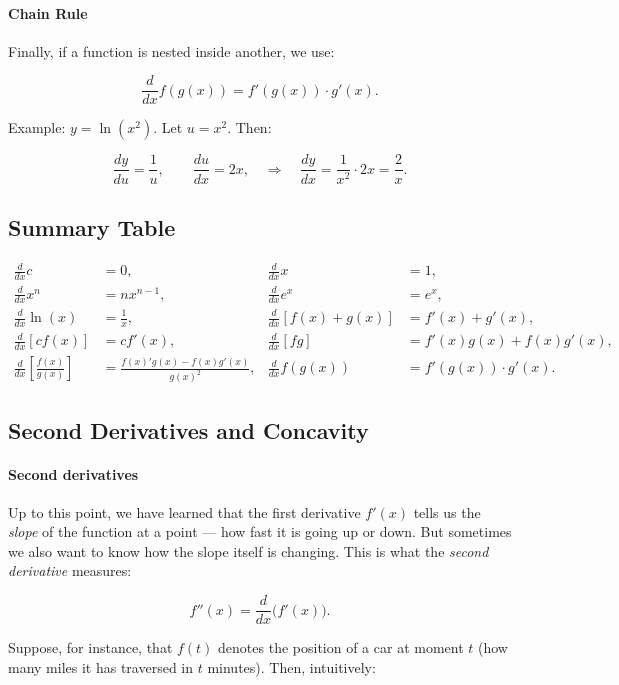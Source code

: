 \documentclass[11pt,letterpaper]{article}
\begin{document}
\paragraph{Chain Rule} 
Finally, if a function is nested inside another, we use:

\[
\frac{d}{dx} f(g(x)) = f'(g(x)) \cdot g'(x).
\]

\noindent Example: $y = \ln(x^2)$. Let $u=x^2$. Then:

\[
\frac{dy}{du} = \frac{1}{u}, \qquad \frac{du}{dx} = 2x, \quad \Rightarrow \quad \frac{dy}{dx} = \frac{1}{x^2}\cdot 2x = \frac{2}{x}.
\]

\subsection*{Summary Table}

\begin{align*}
\frac{d}{dx} c &= 0, & \frac{d}{dx} x &= 1, \\
\frac{d}{dx} x^n &= n x^{n-1}, & \frac{d}{dx} e^x &= e^x, \\
\frac{d}{dx} \ln(x) &= \frac{1}{x}, & \frac{d}{dx}[f(x)+g(x)] &= f'(x) + g'(x), \\
\frac{d}{dx}[cf(x)] &= c f'(x), & \frac{d}{dx}[fg] &= f'(x)g(x) + f(x)g'(x), \\
\frac{d}{dx}\!\left[\frac{f(x)}{g(x)}\right] &= \frac{f(x)'g(x) - f(x)g'(x)}{g(x)^2}, & 
\frac{d}{dx} f(g(x)) &= f'(g(x)) \cdot g'(x).
\end{align*}

\subsection{Second Derivatives and Concavity}

\paragraph{Second derivatives} Up to this point, we have learned that the first derivative $f'(x)$ tells us the \emph{slope} of the function at a point — how fast it is going up or down. But sometimes we also want to know how the slope itself is changing. This is what the \emph{second derivative} measures:

\[
f''(x) = \frac{d}{dx}\big(f'(x)\big).
\]

\noindent Suppose, for instance, that $f(t)$ denotes the position of a car at moment $t$ (how many miles it has traversed in $t$ minutes). Then, intuitively:
\end{document}
